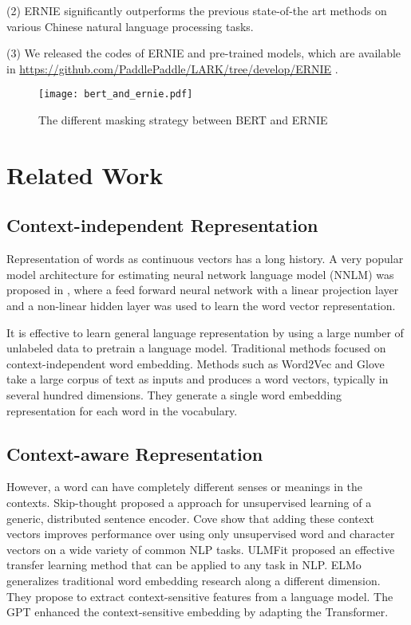 \documentclass[11pt,a4paper]{article}
\begin{document}
(2) ERNIE significantly outperforms the previous state-of-the art methods on various Chinese natural language processing tasks.

(3) We released the codes of ERNIE and pre-trained models, which are available in  \url{https://github.com/PaddlePaddle/LARK/tree/develop/ERNIE} . 

\begin{figure*} 
\centerline{\texttt{[image: bert\_and\_ernie.pdf]}}
\caption{The different masking strategy between BERT and ERNIE}
\label{difference_bert_with_ernie}
\end{figure*}

\section{Related Work}
\subsection{Context-independent Representation}
Representation of words as continuous vectors has a long history. A very popular model architecture for estimating neural network language model (NNLM) was proposed in \cite{bengio2003neural}, where a feed forward neural network with a linear projection layer and a non-linear hidden layer was used to learn the word vector representation.

It is effective to learn general language representation by using a large number of unlabeled data to pretrain a language model. Traditional methods focused on context-independent word embedding. Methods such as Word2Vec \cite{mikolov2013efficient} and Glove \cite{pennington2014glove} take a large corpus of text as inputs and produces a word vectors, typically in several hundred dimensions. They generate a single word embedding representation for each word in the vocabulary.

\subsection{Context-aware Representation}
However, a word can have completely different senses or meanings in the contexts. Skip-thought \cite{kiros2015skip} proposed a approach for unsupervised learning of a generic, distributed sentence encoder. Cove \cite{mccann2017learned} show that adding these context vectors improves performance over using only unsupervised word and character vectors on a wide variety of common NLP tasks. ULMFit \cite{howard2018universal} proposed an effective transfer learning method that can be applied to any task in NLP. ELMo \cite{peters2018deep} generalizes traditional word embedding research along a different dimension. They propose to extract context-sensitive features from a language model. The GPT \cite{radford2018improving} enhanced the context-sensitive embedding by adapting the Transformer. 
\end{document}
